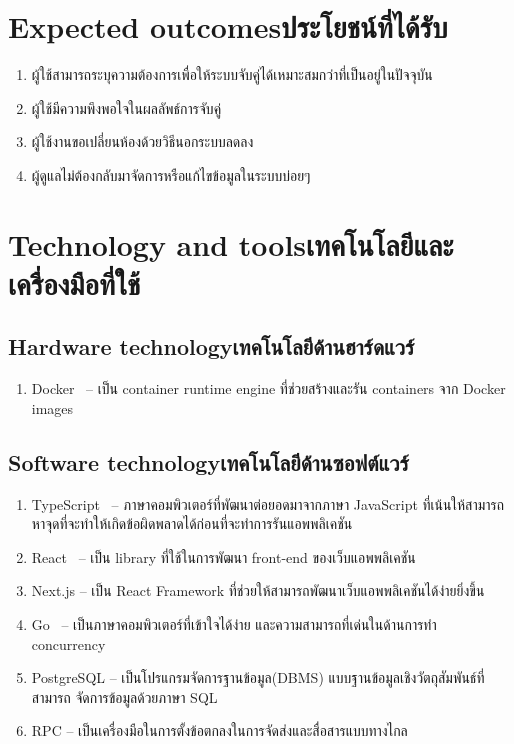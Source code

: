\section{\ifenglish Expected outcomes\else ประโยชน์ที่ได้รับ\fi}
\begin{enumerate}
    \item ผู้ใช้สามารถระบุความต้องการเพื่อให้ระบบจับคู่ได้เหมาะสมกว่าที่เป็นอยู่ในปัจจุบัน
    \item ผู้ใช้มีความพึงพอใจในผลลัพธ์การจับคู่
    \item ผู้ใช้งานขอเปลี่ยนห้องด้วยวิธีนอกระบบลดลง
    \item ผู้ดูแลไม่ต้องกลับมาจัดการหรือแก้ไขข้อมูลในระบบบ่อยๆ
\end{enumerate}

\section{\ifenglish Technology and tools\else เทคโนโลยีและเครื่องมือที่ใช้\fi}

\subsection{\ifenglish Hardware technology\else เทคโนโลยีด้านฮาร์ดแวร์\fi}
\begin{enumerate}
    \item Docker~\cite{dke} -- เป็น container runtime engine ที่ช่วยสร้างและรัน containers จาก Docker images
\end{enumerate}

\subsection{\ifenglish Software technology\else เทคโนโลยีด้านซอฟต์แวร์\fi}
\begin{enumerate}
    \item TypeScript~\cite{typescript} -- ภาษาคอมพิวเตอร์ที่พัฒนาต่อยอดมาจากภาษา JavaScript
          ที่เน้นให้สามารถหาจุดที่จะทำให้เกิดข้อผิดพลาดได้ก่อนที่จะทำการรันแอพพลิเคชัน
    \item React~\cite{react} -- เป็น library ที่ใช้ในการพัฒนา front-end ของเว็บแอพพลิเคชัน
    \item Next.js\cite{nextjs} -- เป็น React Framework ที่ช่วยให้สามารถพัฒนาเว็บแอพพลิเคชันได้ง่ายยิ่งขึ้น
    \item Go~\cite{golang} -- เป็นภาษาคอมพิวเตอร์ที่เข้าใจได้ง่าย และความสามารถที่เด่นในด้านการทำ concurrency
    \item PostgreSQL -- เป็นโปรแกรมจัดการฐานข้อมูล(DBMS) แบบฐานข้อมูลเชิงวัตถุสัมพันธ์ที่สามารถ จัดการข้อมูลด้วยภาษา SQL
    \item RPC -- เป็นเครื่องมือในการตั้งข้อตกลงในการจัดส่งและสื่อสารแบบทางไกล
\end{enumerate}

